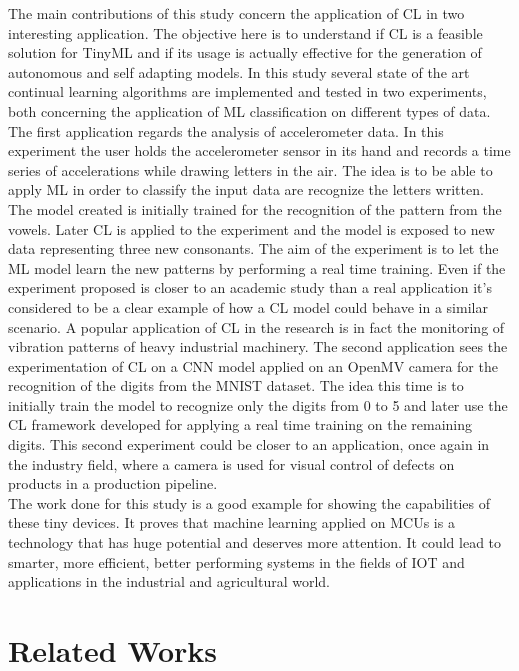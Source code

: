 \documentclass[12pt]{report}
\begin{document}
The main contributions of this study concern the application of CL in two interesting application. The objective here is to understand if CL is a feasible solution for TinyML and if its usage is actually effective for the generation of autonomous and self adapting models. In this study several state of the art continual learning algorithms are implemented and tested in two experiments, both concerning the application of ML classification on different types of data. The first application regards the analysis of accelerometer data. In this experiment the user holds the accelerometer sensor in its hand and records a time series of accelerations while drawing letters in the air. The idea is to be able to apply ML in order to classify the input data are recognize the letters written. The model created is initially trained for the recognition of the pattern from the vowels. Later CL is applied to the experiment and the model is exposed to new data representing three new consonants. The aim of the experiment is to let the ML model learn the new patterns by performing a real time training. Even if the experiment proposed is closer to an academic study than a real application it's considered to be a clear example of how a CL model could behave in a similar scenario. A popular application of CL in the research is in fact the monitoring of vibration patterns of heavy industrial machinery. The second application sees the experimentation of CL on a CNN model applied on an OpenMV camera for the recognition of the digits from the MNIST dataset. The idea this time is to initially train the model to recognize only the digits from 0 to 5 and later use the CL framework developed for applying a real time training on the remaining digits. This second experiment could be closer to an application, once again in the industry field, where a camera is used for visual control of defects on products in a production pipeline.  \\
The work done for this study is a good example for showing the capabilities of these tiny devices. It proves that machine learning applied on MCUs is a technology that has huge potential and deserves more attention. It could lead to smarter, more efficient, better performing systems in the fields of IOT and applications in the industrial and agricultural world. 




\chapter{Related Works}
\end{document}
